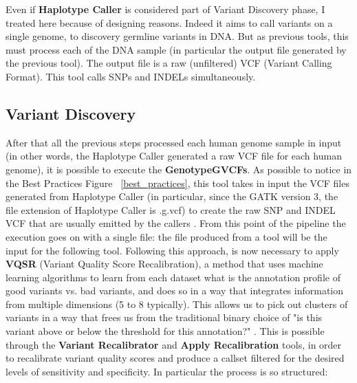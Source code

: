 Even if \textbf{Haplotype Caller} is considered part of Variant Discovery phase, I treated here because of designing reasons. Indeed it aims to call variants on a single genome, to discovery germline variants in DNA. But as previous tools, this must process each of the DNA sample (in particular the output file generated by the previous tool). The output file is a raw (unfiltered) VCF (Variant Calling Format). This tool calls SNPs and INDELs simultaneously.

\subsection{Variant Discovery}
After that all the previous steps processed each human genome sample in input (in other words, the Haplotype Caller generated a raw VCF file for each human genome), it is possible to execute the \textbf{GenotypeGVCFs}. As possible to notice in the Best Practices Figure ~\ref{best_practices}, this tool takes in input the VCF files generated from Haplotype Caller (in particular, since the GATK version 3, the file extension of Haplotype Caller is .g.vcf) to create the raw SNP and INDEL VCF that are usually emitted by the callers \cite{HaplotypeCaller}. From this point of the pipeline the execution goes on with a single file: the file produced from a tool will be the input for the following tool.\newline
Following this approach, is now necessary to apply \textbf{VQSR} (Variant Quality Score Recalibration), a method that uses machine learning algorithms to learn from each dataset what is the annotation profile of good variants vs. bad variants, and does so in a way that integrates information from multiple dimensions (5 to 8 typically). This allows us to pick out clusters of variants in a way that frees us from the traditional binary choice of "is this variant above or below the threshold for this annotation?" \cite{VQSR1,VQSR2}. This is possible through the \textbf{Variant Recalibrator} and \textbf{Apply Recalibration} tools, in order to recalibrate variant quality scores and produce a callset filtered for the desired levels of sensitivity and specificity. In particular the process is so structured:

